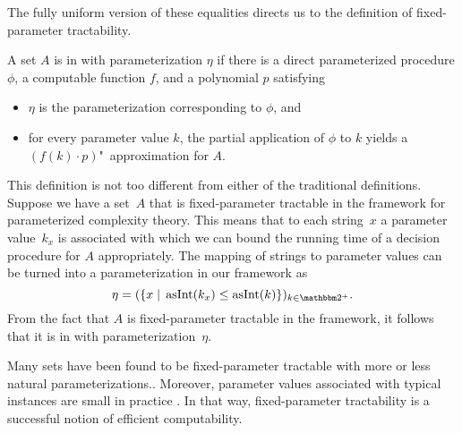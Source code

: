 The fully uniform version of these equalities directs us to the definition of fixed-parameter tractability.
\begin{definition}
\label{def:fpt}%
  A set $A$ is in  with parameterization $\eta$ if there is a direct parameterized procedure $\phi$, a computable function $f$, and a polynomial $p$ satisfying
  \begin{itemize}
  \item $\eta$ is the parameterization corresponding to $\phi$, and
  \item for every parameter value $k$, the partial application of $\phi$ to $k$ yields a $(f(k) \cdot p)$"~approximation for $A$.
  \end{itemize}
\end{definition}

This definition is not too different from either of the traditional definitions.
Suppose we have a set~$A$ that is fixed-parameter tractable in the \citeauthor{flum2006parameterized} framework for parameterized complexity theory.
This means that to each string~$x$ a parameter value~$k_x$ is associated with which we can bound the running time of a decision procedure for $A$ appropriately.
The mapping of strings to parameter values can be turned into a parameterization in our framework as
\begin{equation*}
  \eta \deq (\{x \st \asNat(k_x) \le \asNat(k)\})_{k \in \binary^+}.
\end{equation*}
From the fact that $A$ is fixed-parameter tractable in the \citeauthor{flum2006parameterized} framework, it follows that it is in  with parameterization~$\eta$.

Many sets have been found to be fixed-parameter tractable \parencite{downey1995fixed,niedermeier2006invitation,cygan2015parameterized} with more or less natural parameterizations..
Moreover, parameter values associated with typical instances are small in practice \parencite{downey1999framework,downey1999parameterized}.
In that way, fixed-parameter tractability is a successful notion of efficient computability.

